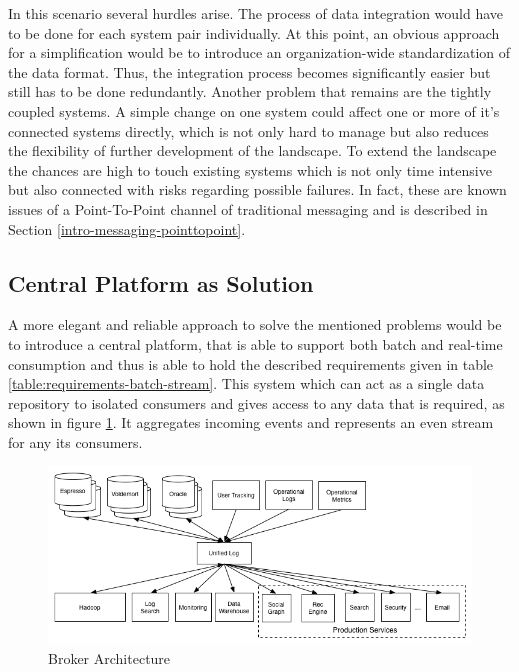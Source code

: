 In this scenario several hurdles arise. The process of data integration would
have to be done for each system pair individually. At this point, an obvious
approach for a simplification would be to introduce an organization-wide
standardization of the data format. Thus, the integration process becomes 
significantly easier but still has to be done redundantly. Another problem that
remains are the tightly coupled systems. A simple change on one system could
affect one or more of it's connected systems directly, which is not only hard to
manage but also reduces the flexibility of further development of the landscape.
To extend the landscape the chances are high to touch existing systems which is
not only time intensive but also connected with risks regarding possible failures. In fact,
these are known issues of a Point-To-Point channel of traditional messaging and
is described in Section \ref{intro-messaging-pointtopoint}.

\subsection{Central Platform as Solution}
\label{intro-datastream-centralplatform}
A more elegant and reliable approach to solve the mentioned problems would be to
introduce a central platform, that is able to support both batch and real-time
consumption and thus is able to hold the described requirements given in table
\ref{table:requirements-batch-stream}. This system which can act as a single
data repository to isolated consumers and gives access to any data that is
required, as shown in figure \ref{fig:datapipeline_simple}. It aggregates
incoming events and represents an even stream for any its consumers. 

\begin{figure}[H]
    \centering
    \includegraphics[width=1.0\textwidth]{images/datapipeline_simple.png}
    \caption{Broker Architecture}
    \label{fig:datapipeline_simple}
\end{figure}

